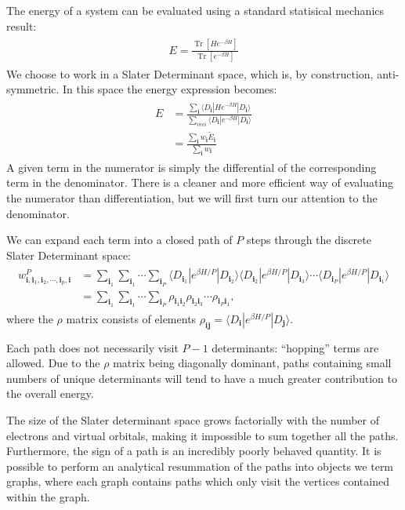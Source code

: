 \documentclass[openany,a4paper,10pt]{manual}
\newcommand{\bra}{\ensuremath{\langle}}
\newcommand{\ket}{\ensuremath{\rangle}}
\newcommand{\veci}{\ensuremath{\mathbf{i}}}
\newcommand{\vecj}{\ensuremath{\mathbf{j}}}
\begin{document}
The energy of a system can be evaluated using a standard statisical mechanics result:
\begin{align}\begin{split}E = \frac{\operatorname{Tr}[H e^{-\beta H}]}{\operatorname{Tr}[e^{-\beta H}]}\end{split}\end{align}
We choose to work in a Slater Determinant space, which is, by construction, anti-symmetric.  In this space the energy expression becomes:
\begin{align}\begin{split}E &= \frac{\sum_{\veci} \bra D_{\veci} | H e^{-\beta H} | D_{\veci} \ket}{\sum_{veci} \bra D_{\veci} | e^{-\beta H} | D_{\veci} \ket} \\    &= \frac{\sum_{\veci} w_{\veci} \tilde{E}_{\veci}}{\sum_{\veci} w_{\veci}}\end{split}\end{align}
A given term in the numerator is simply the differential of the
corresponding term in the denominator.  There is a cleaner and more
efficient way of evaluating the numerator than differentiation, but we
will first turn our attention to the denominator.

We can expand each term into a closed path of $P$ steps through the discrete Slater Determinant space:
\begin{align}\begin{split}w^P_{\veci,\veci_1,\veci_2,\cdots,\veci_p,\veci} &= \sum_{\veci_1} \sum_{\veci_1} \cdots \sum_{\veci_P} \bra D_{\veci_1} | e^{\beta H/P} | D_{\veci_2}  \ket \bra D_{\veci_2} | e^{\beta H/P} | D_{\veci_3}  \ket \cdots \bra D_{\veci_P} | e^{\beta H/P} | D_{\veci_1}  \ket \\  & =  \sum_{\veci_1} \sum_{\veci_1} \cdots \sum_{\veci_P} \rho_{\veci_1\veci_2} \rho_{\veci_2\veci_3} \cdots \rho_{\veci_P\veci_1},\end{split}\end{align}
where the $\rho$ matrix consists of elements
$\rho_{\veci\vecj}=\bra D_{\veci} | e^{\beta H/P} | D_{\vecj} \ket$.

Each path does not necessarily visit $P-1$ determinants: ``hopping''
terms are allowed.  Due to the $\rho$ matrix being diagonally
dominant, paths containing small numbers of unique determinants will
tend to have a much greater contribution to the overall energy.

The size of the Slater determinant space grows factorially with the number
of electrons and virtual orbitals, making it impossible to sum together
all the paths.  Furthermore, the sign of a path is an incredibly poorly
behaved quantity.  It is possible to perform an analytical resummation
of the paths into objects we term graphs, where each graph contains
paths which only visit the vertices contained within the graph.
\end{document}
